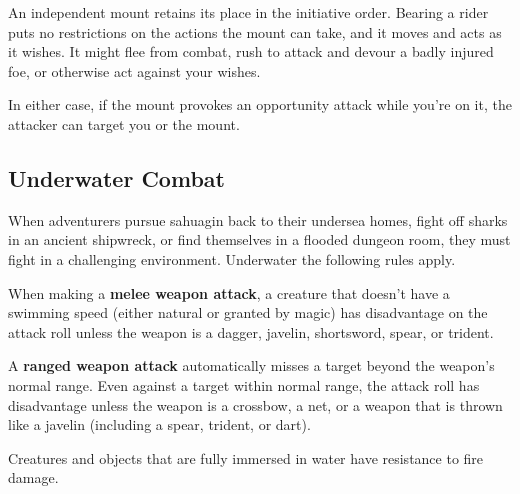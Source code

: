 \documentclass[
]{article}
\begin{document}
An independent mount retains its place in the initiative order. Bearing
a rider puts no restrictions on the actions the mount can take, and it
moves and acts as it wishes. It might flee from combat, rush to attack
and devour a badly injured foe, or otherwise act against your wishes.

In either case, if the mount provokes an opportunity attack while you're
on it, the attacker can target you or the mount.

\hypertarget{underwater-combat}{%
\subsection{Underwater Combat}\label{underwater-combat}}

When adventurers pursue sahuagin back to their undersea homes, fight off
sharks in an ancient shipwreck, or find themselves in a flooded dungeon
room, they must fight in a challenging environment. Underwater the
following rules apply.

When making a \textbf{melee weapon attack}, a creature that doesn't have
a swimming speed (either natural or granted by magic) has disadvantage
on the attack roll unless the weapon is a dagger, javelin, shortsword,
spear, or trident.

A \textbf{ranged weapon attack} automatically misses a target beyond the
weapon's normal range. Even against a target within normal range, the
attack roll has disadvantage unless the weapon is a crossbow, a net, or
a weapon that is thrown like a javelin (including a spear, trident, or
dart).

Creatures and objects that are fully immersed in water have resistance
to fire damage.
\end{document}
